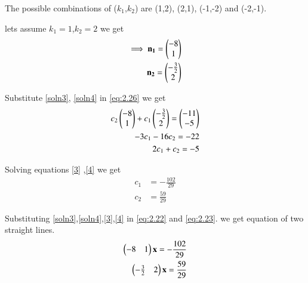 \documentclass[journal,12pt,twocolumn]{IEEEtran}
\begin{document}
The possible combinations of ($k_1$,$k_2$) are (1,2), (2,1), (-1,-2) and (-2,-1).

lets assume $k_1=1$,$k_2=2$ we get
\begin{align}
    \implies\mathbf{n_1}=\begin{pmatrix}-8\\1\end{pmatrix}\label{soln3}\\
    \mathbf{n_2}=\begin{pmatrix}-\frac{3}{2}\\2\end{pmatrix}\label{soln4}
\end{align}

Substitute \eqref{soln3}, \eqref{soln4} in \eqref{eq:2.26} we get 
\begin{align}
    c_2\begin{pmatrix}-8\\1\end{pmatrix}+c_1\begin{pmatrix}-\frac{3}{2}\\2\end{pmatrix}=\begin{pmatrix} -11\\ -5\end{pmatrix}\\
    -3c_1-16c_2=-22\label{3}\\
    2c_1+c_2=-5\label{4}
\end{align}

Solving equations \eqref{3} ,\eqref{4} we get 
\begin{align}
    c_1&=-\frac{102}{29}\\
    c_2&=\frac{59}{29}
\end{align}

Substituting \eqref{soln3},\eqref{soln4},\eqref{3},\eqref{4} in \eqref{eq:2.22} and \eqref{eq:2.23}. we get equation of two straight lines.
\begin{align}
    \begin{pmatrix}-8 & 1\end{pmatrix}\mathbf{x}=-\frac{102}{29}\\
    \begin{pmatrix}-\frac{3}{2} & 2\end{pmatrix}\mathbf{x}=\frac{59}{29}
\end{align}
\end{document}
